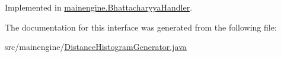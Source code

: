 Implemented in \hyperlink{classmainengine_1_1_bhattacharyya_handler_aaf0d9ca0ecc056d53a2f6f42f41e0b99}{mainengine.\+Bhattacharyya\+Handler}.



The documentation for this interface was generated from the following file\+:\begin{DoxyCompactItemize}
\item 
src/mainengine/\hyperlink{_distance_histogram_generator_8java}{Distance\+Histogram\+Generator.\+java}\end{DoxyCompactItemize}
